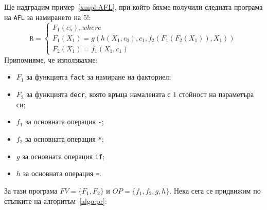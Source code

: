 \documentclass[12pt,twoside,a4paper]{article}
\begin{document}
	\label{xmpl:pr}
	\indent Ще надградим пример~\ref{xmpl:AFL}, при който бяхме получили следната програма на \texttt{AFL} за намирането на $5!$:
	\begin{equation*}
		\texttt{R} =
		\begin{cases}
			F_1(c_5), where\\
			F_1(X_1)=g(h(X_1,c_0),c_1,f_2(F_1(F_2(X_1)),X_1))\\
			F_2(X_1)=f_1(X_1,c_1)
		\end{cases}
	\end{equation*}
	Припомняме, че използвахме:
	\newpage
	\begin{itemize}
		\item $F_1$ за функцията \texttt{fact} за намиране на факториел;
		\item $F_2$ за функцията \texttt{decr}, която връща намалената с $1$ стойност на параметъра си;
		\item $f_1$ за основната операция \texttt{-};
		\item $f_2$ за основната операция \texttt{*};
		\item $g$ за основната операция \texttt{if};
		\item $h$ за основната операция \texttt{=}.
	\end{itemize}
	За тази програма $FV = \{F_1, F_2\}$ и $OP = \{f_1, f_2, g, h\}$. Нека сега се придвижим по стъпките на алгоритъм~\ref{algo:pr}:
\end{document}
